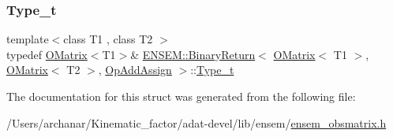 \subsubsection{\texorpdfstring{Type\_t}{Type\_t}\hspace{0.1cm}{\footnotesize\ttfamily [3/3]}}
{\footnotesize\ttfamily template$<$class T1 , class T2 $>$ \\
typedef \mbox{\hyperlink{classENSEM_1_1OMatrix}{O\+Matrix}}$<$T1$>$\& \mbox{\hyperlink{structENSEM_1_1BinaryReturn}{E\+N\+S\+E\+M\+::\+Binary\+Return}}$<$ \mbox{\hyperlink{classENSEM_1_1OMatrix}{O\+Matrix}}$<$ T1 $>$, \mbox{\hyperlink{classENSEM_1_1OMatrix}{O\+Matrix}}$<$ T2 $>$, \mbox{\hyperlink{structENSEM_1_1OpAddAssign}{Op\+Add\+Assign}} $>$\+::\mbox{\hyperlink{structENSEM_1_1BinaryReturn_3_01OMatrix_3_01T1_01_4_00_01OMatrix_3_01T2_01_4_00_01OpAddAssign_01_4_ac7f4c7cfa59cf0bc46d8cf9fb7c5189f}{Type\+\_\+t}}}



The documentation for this struct was generated from the following file\+:\begin{DoxyCompactItemize}
\item 
/\+Users/archanar/\+Kinematic\+\_\+factor/adat-\/devel/lib/ensem/\mbox{\hyperlink{adat-devel_2lib_2ensem_2ensem__obsmatrix_8h}{ensem\+\_\+obsmatrix.\+h}}\end{DoxyCompactItemize}

